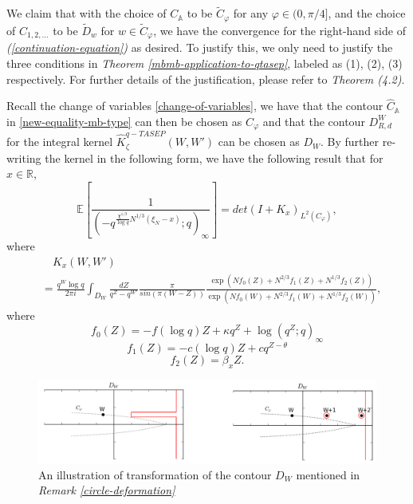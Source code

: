 We claim that with the choice of $C_{\mathbb{A}}$ to be $\tilde{C}_{\varphi}$ for any $\varphi \in (0, \pi / 4]$, and the choice of $C_{1, 2, \dots}$ to be $\tilde{D}_{w}$ for $w \in \tilde{C}_{\varphi}$, we have the convergence for the right-hand side of \textit{(\ref{continuation-equation})} as desired. To justify this, we only need to justify the three conditions in \textit{Theorem \ref{mbmb-application-to-qtasep}}, labeled as (1), (2), (3) respectively. For further details of the justification, please refer to \textit{\cite{asymptotics2013} Theorem (4.2)}.

Recall the change of variables \eqref{change-of-variables}, we have that the contour $\hat{C}_{\mathbb{A}}$ in \eqref{new-equality-mb-type} can then be chosen as $C_{\varphi}$ and that the contour $D_{R,d}^W$ for the integral kernel $\hat{K}_{\zeta}^{q-TASEP}(W,W')$ can be chosen as $D_W$. By further re-writing the kernel in the following form, we have the following result that for $x \in \mathbb{R}$, 
\begin{equation}
\label{new-equality-mb-type-2}
\mathbb{E} \left[ \frac{1}{( -q^{ \frac{\chi^{1/3}}{\log q} N^{1/3} (\xi_N - x) }; q )_{\infty}} \right] = det(I+K_x)_{L^2(C_{\varphi})},
\end{equation}
where 
\begin{align*}
& \quad K_x(W,W') \\
& = \frac{q^W \log q}{2 \pi i} \int_{D_W} \frac{dZ}{q^Z - q^{W'}} \frac{\pi}{sin(\pi (W-Z))} \frac{\exp(Nf_0(Z) + N^{2/3} f_1(Z) + N^{1/3} f_2(Z))}{\exp(Nf_0(W) + N^{2/3} f_1(W) + N^{1/3} f_2(W))},
\end{align*}
where
\begin{equation*}
f_0(Z) = -f (\log q) Z + \kappa q^Z + \log(q^Z; q)_{\infty}
\end{equation*}
\begin{equation*}
f_1(Z) = -c (\log q) Z + cq^{Z - \theta}
\end{equation*}
\begin{equation*}
f_2(Z) = \beta_x Z.
\end{equation*}

\begin{figure}
	\centering
	\includegraphics[width=\textwidth]{circle-deformation}
	\caption[Contour replacement of $D_W$]
	{An illustration of transformation of the contour $D_W$ mentioned in \textit{Remark \ref{circle-deformation}}}
	\label{fig:contour-dw-circle}
\end{figure}

